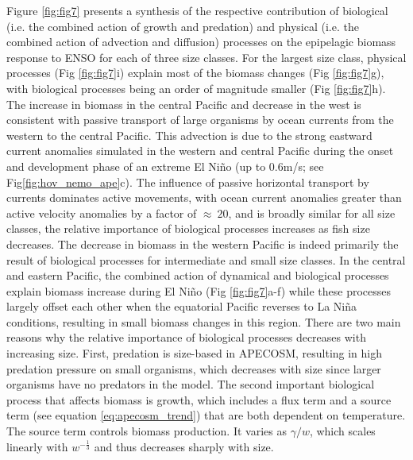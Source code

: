 Figure \ref{fig:fig7} presents a synthesis of the respective contribution of biological (i.e. the combined action of growth and predation) and physical (i.e. the combined action of advection and diffusion) processes on the epipelagic biomass response to ENSO for each of three size classes. For the largest size class, physical processes (Fig \ref{fig:fig7}i) explain most of the biomass changes (Fig \ref{fig:fig7}g), with biological processes being an order of magnitude smaller (Fig \ref{fig:fig7}h). The increase in biomass in the central Pacific and decrease in the west is consistent with passive transport of large organisms by ocean currents from the western to the central Pacific. This advection is due to the strong eastward current anomalies simulated in the western and central Pacific during the onset and development phase of an extreme El Niño (up to 0.6m/s; see Fig\ref{fig:hov_nemo_ape}c). The influence of passive horizontal transport by currents dominates active movements, with ocean current anomalies greater than active velocity anomalies by a factor of $\approx\ 20$, and is broadly similar for all size classes, the relative importance of biological processes increases as fish size decreases. The decrease in biomass in the western Pacific is indeed primarily the result of biological processes for intermediate and small size classes. In the central and eastern Pacific, the combined action of dynamical and biological processes explain biomass increase during El Niño (Fig \ref{fig:fig7}a-f) while these processes largely offset each other when the equatorial Pacific reverses to La Niña conditions, resulting in small biomass changes in this region. There are two main reasons why the relative importance of biological processes decreases with increasing size. First, predation is size-based in APECOSM, resulting in high predation pressure on small organisms, which decreases with size since larger organisms have no predators in the model. The second important biological process that affects biomass is growth, which includes a flux term and a source term (see equation \ref{eq:apecosm_trend}) that are both dependent on temperature. The source term controls biomass production. It varies as ${\gamma}/{w}$, which scales linearly with $w^{-\frac{1}{3}}$ and thus decreases sharply with size.


